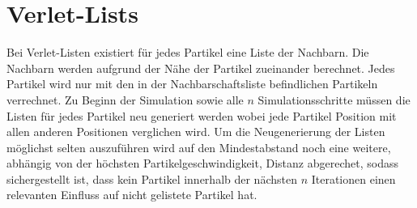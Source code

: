 \documentclass[
	12pt,
	a4paper,
	BCOR10mm,
	DIV14,
	headsepline,
]{scrreprt}
\begin{document}
\section{Verlet-Lists}
Bei Verlet-Listen existiert für jedes Partikel eine Liste der Nachbarn. Die Nachbarn werden aufgrund der Nähe der Partikel zueinander berechnet. Jedes Partikel wird nur mit den in der Nachbarschaftsliste befindlichen Partikeln verrechnet. Zu Beginn der Simulation sowie alle $n$ Simulationsschritte müssen die Listen für jedes Partikel neu generiert werden wobei jede Partikel Position mit allen anderen Positionen verglichen wird. Um die Neugenerierung der Listen möglichst selten auszuführen wird auf den Mindestabstand noch eine weitere, abhängig von der höchsten Partikelgeschwindigkeit, Distanz abgerechet, sodass sichergestellt ist, dass kein Partikel innerhalb der nächsten $n$ Iterationen einen relevanten Einfluss auf nicht gelistete Partikel hat. %
\end{document}
